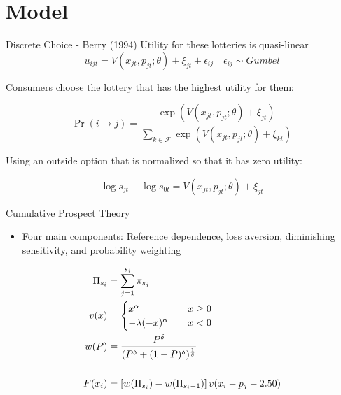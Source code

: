 \documentclass[bigger]{beamer}
\begin{document}
\section{Model}
\label{sec:orgd0dc4ac}

\begin{frame}[label={sec:org51c43d8}]{Discrete Choice - Berry (1994)}
Utility for these lotteries is quasi-linear
\begin{equation*}
  u_{ijt} = V( x_{jt}, p_{jt}; \theta ) + \xi_{jt} + \epsilon_{ij} \quad \epsilon_{ij} \sim Gumbel
\end{equation*}

Consumers choose the lottery that has the highest utility for them: 

\begin{equation*}
  \Pr( i \rightarrow j ) = \frac{\exp( V(x_{jt},p_{jt} ; \theta) + \xi_{jt})}{ \sum_{k \in \mathcal{F}}
    \exp(V(x_{jt},p_{jt}; \theta) + \xi_{kt})}
\end{equation*}

Using an outside option that is normalized so that it has zero
utility:

\begin{equation*}
  \log s_{jt} - \log s_{0t} = V(x_{jt}, p_{jt}; \theta) + \xi_{jt}
\end{equation*}
\end{frame}



\begin{frame}[label={sec:org5aa67ff}]{Cumulative Prospect Theory}
\begin{itemize}
\item Four main components: Reference dependence, loss aversion,
diminishing sensitivity, and probability weighting
\end{itemize}
\begin{align*}
  \Pi_{s_i} &= \sum_{j=1}^{s_i} \pi_{s_j}\\
  v(x) &=
  \begin{cases}
    x^\alpha \quad &x \geq 0\\
    -\lambda(-x)^\alpha \quad &x < 0
  \end{cases}\\
  w(P) &= \frac{ P^\delta }{( P^\delta + (1-P)^\delta )^{\frac{1}{\delta}}}\\
  \\
  F(x_i) &= \left [ w( \Pi_{s_i}) - w(\Pi_{s_i - 1})  \right ] v( x_i - p_j - 2.50)
\end{align*}
\end{frame}
\end{document}
